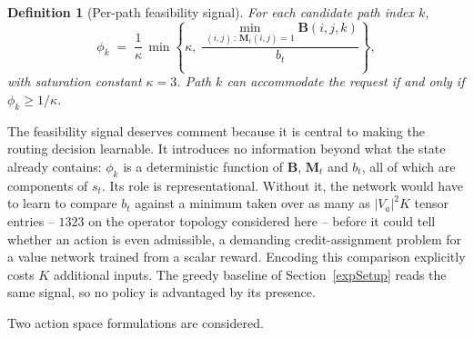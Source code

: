 \documentclass[10pt,journal,comsoc]{IEEEtran}
\newtheorem{definition}{Definition}
\begin{document}
\begin{definition}[Per-path feasibility signal]
\label{def:phi}
For each candidate path index $k$,
\begin{equation}
\phi_k \;=\; \frac{1}{\kappa}\,
\min\!\left\{
\kappa,\;
\frac{\displaystyle\min_{(i,j)\,:\,\mathbf{M}_t(i,j)=1} \mathbf{B}(i,j,k)}
     {b_t}
\right\},
\label{eq:phi}
\end{equation}
with saturation constant $\kappa=3$. Path $k$ can accommodate the
request if and only if $\phi_k \geq 1/\kappa$.
\end{definition}

The feasibility signal deserves comment because it is central to making
the routing decision learnable. It introduces no information beyond what
the state already contains: $\phi_k$ is a deterministic function of
$\mathbf{B}$, $\mathbf{M}_t$ and $b_t$, all of which are components of
$s_t$. Its role is representational. Without it, the network would have
to learn to compare $b_t$ against a minimum taken over as many as
$|V_a|^2K$ tensor entries -- $1323$ on the operator topology considered
here -- before it could tell whether an action is even admissible, a
demanding credit-assignment problem for a value network trained from a
scalar reward. Encoding this comparison explicitly costs $K$ additional
inputs. The greedy baseline of Section~\ref{expSetup} reads the same
signal, so no policy is advantaged by its presence.

Two action space formulations are considered.
\end{document}
